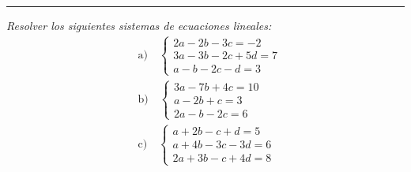 \documentclass[11pt,letterpaper]{article}
\begin{document}
\rule{17cm}{0.1mm}

\begin{tcolorbox}[title=Problema 1, colframe=G, coltitle=B, fonttitle=\bfseries]
\textit{Resolver los siguientes sistemas de ecuaciones lineales:}
    \begin{align*}
        &\text{a)} \quad 
        \begin{cases}
            2a - 2b - 3c = -2 \\
            3a - 3b - 2c + 5d = 7 \\
            a - b - 2c - d = 3
        \end{cases} \\[10pt]
        &\text{b)} \quad 
        \begin{cases}
            3a - 7b + 4c = 10 \\
            a - 2b + c = 3 \\
            2a - b - 2c = 6
        \end{cases} \\[10pt]
        &\text{c)} \quad 
        \begin{cases}
            a + 2b - c + d = 5 \\
            a + 4b - 3c - 3d = 6 \\
            2a + 3b - c + 4d = 8
        \end{cases}
    \end{align*}    
\end{tcolorbox}
\end{document}
